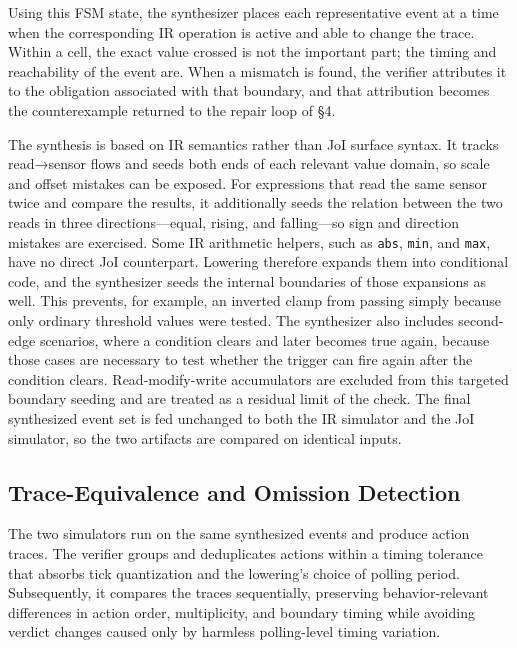 \documentclass[sigconf,nonacm,anonymous,review]{acmart}
\begin{document}
Using this FSM state, the synthesizer places each representative event at a time when the corresponding IR operation is active and able to change the trace. Within a cell, the exact value crossed is not the important part; the timing and reachability of the event are. When a mismatch is found, the verifier attributes it to the obligation associated with that boundary, and that attribution becomes the counterexample returned to the repair loop of \S4.

The synthesis is based on IR semantics rather than JoI surface syntax. It tracks read→sensor flows and seeds both ends of each relevant value domain, so scale and offset mistakes can be exposed. For expressions that read the same sensor twice and compare the results, it additionally seeds the relation between the two reads in three directions—equal, rising, and falling—so sign and direction mistakes are exercised. Some IR arithmetic helpers, such as \texttt{abs}, \texttt{min}, and \texttt{max}, have no direct JoI counterpart. Lowering therefore expands them into conditional code, and the synthesizer seeds the internal boundaries of those expansions as well. This prevents, for example, an inverted clamp from passing simply because only ordinary threshold values were tested. The synthesizer also includes second-edge scenarios, where a condition clears and later becomes true again, because those cases are necessary to test whether the trigger can fire again after the condition clears. Read-modify-write accumulators are excluded from this targeted boundary seeding and are treated as a residual limit of the check. The final synthesized event set is fed unchanged to both the IR simulator and the JoI simulator, so the two artifacts are compared on identical inputs.

\subsection{Trace-Equivalence and Omission Detection}

The two simulators run on the same synthesized events and produce action traces. The verifier groups and deduplicates actions within a timing tolerance that absorbs tick quantization and the lowering's choice of polling period. Subsequently, it compares the traces sequentially, preserving %
behavior-relevant differences in action order, multiplicity, and boundary timing while avoiding verdict changes caused only by harmless polling-level timing variation.
\end{document}
